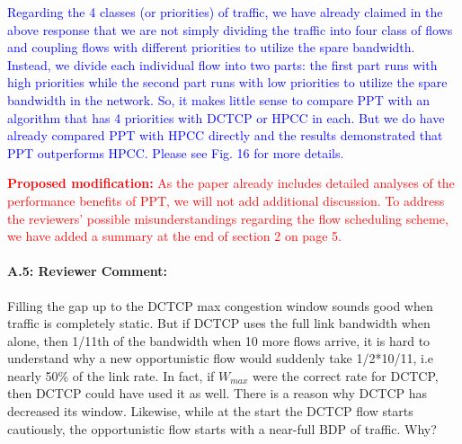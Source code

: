 \documentclass[12pt,one-column]{article}
\begin{document}
\textcolor{blue}{Regarding the 4 classes (or priorities) of traffic, we have already claimed in the above response that we are not simply dividing the traffic into four class of flows and coupling flows with different priorities to utilize the spare bandwidth. Instead, we divide each individual flow into two parts: the first part runs with high priorities while the second part runs with low priorities to utilize the spare bandwidth in the network. 
So, it makes little sense to compare PPT with an algorithm that has 4 priorities with DCTCP or HPCC in each.
But we do have already compared PPT with HPCC directly and the results demonstrated that PPT outperforms HPCC. Please see Fig. 16 for more details. }

\noindent\textcolor{red}{\textbf{Proposed modification: }
As the paper already includes detailed analyses of the performance benefits of PPT, we will not add additional discussion. 
To address the reviewers' possible misunderstandings regarding the flow scheduling scheme, we have added a summary at the end of section 2 on page 5.
}





{\it \paragraph{A.5: Reviewer Comment:}Filling the gap up to the DCTCP max congestion window sounds good when traffic is completely static. But if DCTCP uses the full link bandwidth when alone, then 1/11th of the bandwidth when 10 more flows arrive, it is hard to understand why a new opportunistic flow would suddenly take 1/2*10/11, i.e nearly 50\% of the link rate. In fact, if $W_{max}$ were the correct rate for DCTCP, then DCTCP could have used it as well. There is a reason why DCTCP has decreased its window. Likewise, while at the start the DCTCP flow starts cautiously, the opportunistic flow starts with a near-full BDP of traffic. Why?}
\end{document}
